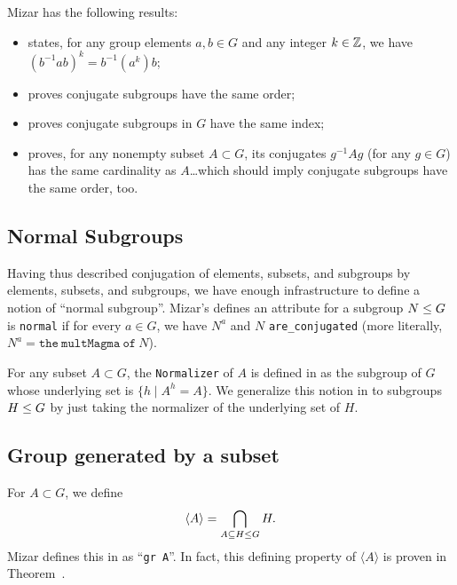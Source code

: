 \begin{thm-remark}
Mizar has the following results:
\begin{itemize}
\item {} states, for any group elements $a,b\in G$ and
  any integer $k\in\mathbb{Z}$, we have $(b^{-1}ab)^{k} = b^{-1}(a^{k})b$;
\item {} proves conjugate subgroups have the same order;
\item {} proves conjugate subgroups in $G$ have the
  same index;
\item {} proves, for any nonempty subset $A\subset G$,
  its conjugates $g^{-1}Ag$ (for any $g\in G$) has the same cardinality
  as $A$\dots which should imply conjugate subgroups have the same
  order, too.
\end{itemize}
\end{thm-remark}


\subsection{Normal Subgroups}
Having thus described conjugation of elements, subsets, and subgroups by
elements, subsets, and subgroups, we have enough infrastructure to
define a notion of ``normal subgroup''. Mizar's
 defines an attribute for a subgroup
$N\leq G$ is \lstinline{normal} if for
every $a\in G$, we have $N^{a}$ and $N$ \lstinline{are_conjugated} (more
literally, $N^{a} = \mathtt{the~multMagma~of~}N$).

For any subset $A\subset G$, the \lstinline{Normalizer} of $A$ is defined in
 as the subgroup of $G$ whose
underlying set is $\{h \mid A^{h} = A\}$. We generalize this notion in
 to subgroups $H\leq G$ by just taking the
normalizer of the underlying set of $H$.

\subsection{Group generated by a subset}
For $A\subset G$, we define
\begin{equation}
\langle A\rangle = \bigcap_{A\subseteq H\leq G} H.
\end{equation}
Mizar defines this in  as
``\lstinline{gr A}''. In fact, this defining
property of $\langle A\rangle$ is proven in Theorem~.


